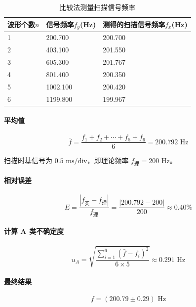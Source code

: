 \documentclass[]{../template/Report}%
\begin{document}
\begin{table}[H]
\centering
\caption{比较法测量扫描信号频率}
\label{tab:freq}
\begin{tabular}{|l|l|l|}
\hline
波形个数$n$ & 信号频率$f_y$(\si{\hertz}) & 测得的扫描信号频率$f_x$(\si{\hertz}) \\ \hline
1       & 200.700                & 200.700       \\ \hline
2       & 403.100                & 201.550        \\ \hline
3       & 605.300                & 201.767        \\ \hline
4       & 801.400               & 200.350        \\ \hline
5       & 1002.100                &200.420        \\ \hline
6       & 1199.800               & 199.967        \\ \hline
\end{tabular}
\end{table}
\paragraph{平均值}
\begin{equation*}
    \bar{f} = \frac{f_1 + f_2 + \cdots + f_5 + f_6}{6} = 200.792 \text{ Hz}
\end{equation*}

扫描时基信号为 $0.5 \text{ ms/div}$，即理论频率 $f_{\text{理}} = 200 \text{ Hz}$。

\paragraph{相对误差}
\begin{equation*}
    E = \frac{|f_{\text{实}} - f_{\text{理}}|}{f_{\text{理}}} = \frac{|200.792 - 200|}{200} \approx 0.40\%
\end{equation*}

\paragraph{计算 A 类不确定度}
\begin{equation*}
    u_A = \sqrt{\frac{\sum_{i=1}^{6} (\bar{f} - f_i)^2}{6 \times 5}} \approx 0.291 \text{ Hz}
\end{equation*}

\paragraph{最终结果}
\begin{equation*}
    f = (200.79 \pm 0.29) \text{ Hz}
\end{equation*}
\end{document}
